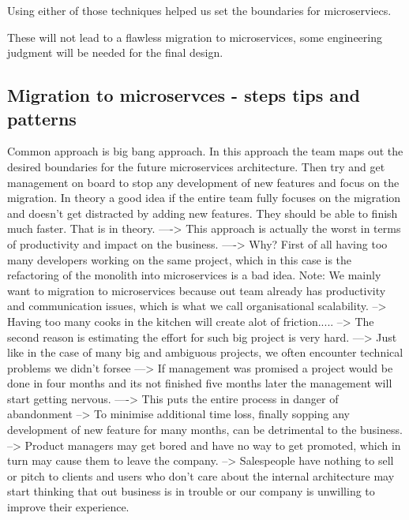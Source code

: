 \documentclass[a4paper, 11pt]{book}
\begin{document}
    Using either of those techniques helped us set the boundaries for microserviecs.

    These will not lead to a flawless migration to microservices, some engineering judgment will be needed for the final design.

    \subsection{Migration to microservces - steps tips and patterns}
    Common approach is big bang approach.
    In this approach the team maps out the desired boundaries for the future microservices architecture.
    Then try and get management on board to stop any development of new features and focus on the migration.
    In theory a good idea if the entire team fully focuses on the migration and doesn't get distracted by adding new features.
    They should be able to finish much faster.
    That is in theory.
    ----> This approach is actually the worst in terms of productivity and impact on the business.
    ----> Why?
    First of all having too many developers working on the same project, which in this case is the refactoring of the monolith into microservices is a bad idea.
    Note: We mainly want to migration to microservices because out team already has productivity and communication issues, which is what we call organisational scalability.
    --> Having too many cooks in the kitchen will create alot of friction.....
    --> The second reason is estimating the effort for such big project is very hard.
    ---> Just like in the case of many big and ambiguous projects, we often encounter technical problems we didn't forsee
    ---> If management was promised a project would be done in four months and its not finished five months later the management will start getting nervous.
    ----> This puts the entire process in danger of abandonment
    --> To minimise additional time loss, finally sopping any development of new feature for many months, can be detrimental to the business.
    --> Product managers may get bored and have no way to get promoted, which in turn may cause them to leave the company.
    --> Salespeople have nothing to sell or pitch to clients and users who don't care about the internal architecture may start thinking that out business is in trouble or our company is unwilling to improve their experience.
\end{document}
